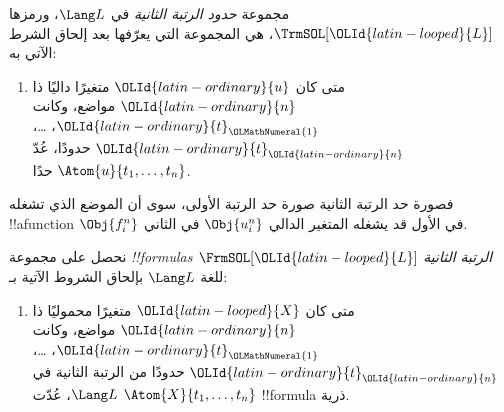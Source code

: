 \documentclass[../../../include/open-logic-section]{subfiles}
\begin{document}
\begin{defn}
مجموعة \emph{حدود الرتبة الثانية} في $\Lang L$، ورمزها
$\TrmSOL[\OLId{latin-looped}{L}]$، هي المجموعة التي يعرّفها
 بعد إلحاق الشرط الآتي به:
\begin{enumerate}
\item متى كان $\OLId{latin-ordinary}{u}$ متغيرًا داليًا ذا $\OLId{latin-ordinary}{n}$ مواضع،
وكانت $\OLId{latin-ordinary}{t}_\OLMathNumeral{1}$، \dots، $\OLId{latin-ordinary}{t}_\OLId{latin-ordinary}{n}$ حدودًا، عُدّ
$\Atom{u}{t_1, \ldots, t_n}$ حدًا.
\end{enumerate}
\end{defn}

\begin{explain}
فصورة حد الرتبة الثانية صورة حد الرتبة الأولى، سوى أن الموضع
الذي تشغله !!a{function} $\Obj{f^n_i}$ في الأول قد يشغله
المتغير الدالي $\Obj{u^n_i}$ في الثاني.
\end{explain}

\begin{defn}
نحصل على مجموعة \emph{!!{formula}s الرتبة الثانية}
$\FrmSOL[\OLId{latin-looped}{L}]$ للغة $\Lang L$ بإلحاق الشروط الآتية
بـ:
\begin{enumerate}
\item متى كان $\OLId{latin-looped}{X}$ متغيرًا محموليًا ذا $\OLId{latin-ordinary}{n}$ مواضع،
وكانت $\OLId{latin-ordinary}{t}_\OLMathNumeral{1}$، \dots، $\OLId{latin-ordinary}{t}_\OLId{latin-ordinary}{n}$ حدودًا من الرتبة الثانية في
$\Lang L$، عُدّت $\Atom{X}{t_1,\ldots, t_n}$ !!{formula} ذرية.




\end{enumerate}
\end{defn}
\end{document}
